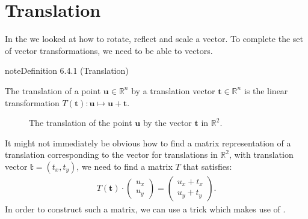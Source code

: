 \documentclass[letterpaper,10pt,english]{jupyterBook}
\let\sphinxpxdimen\pdfpxdimen\else\newdimen\sphinxpxdimen
\begin{document}
\sphinxstepscope

\ignorespaces 

\section{Translation}
\label{\detokenize{_pages/6.4_Translation:translation}}\label{\detokenize{_pages/6.4_Translation:index-0}}\label{\detokenize{_pages/6.4_Translation:translation-section}}\label{\detokenize{_pages/6.4_Translation::doc}}
\sphinxAtStartPar
In the {\hyperref[\detokenize{_pages/6.3_Rotation_reflection_and_translation:rotation-reflection-and-scaling-section}]{}} we looked at how to rotate, reflect and scale a vector. To complete the set of vector transformations, we need to be able to  vectors.
\label{_pages/6.4_Translation:translation-definition}
\begin{sphinxadmonition}{note}{Definition 6.4.1 (Translation)}



\sphinxAtStartPar
The translation of a point \(\mathbf{u} \in \mathbb{R}^n\) by a translation vector \(\mathbf{t} \in \mathbb{R}^n\) is the linear transformation \(T(\mathbf{t}): \mathbf{u} \mapsto \mathbf{u} + \mathbf{t}\).
\end{sphinxadmonition}

\begin{figure}[htbp]
\centering
\capstart

\noindent\sphinxincludegraphics[width=400\sphinxpxdimen]{{6_translation}.svg}
\caption{The translation of the point \(\mathbf{u}\) by the vector \(\mathbf{t}\) in \(\mathbb{R}^2\).}\label{\detokenize{_pages/6.4_Translation:translation-figure}}\end{figure}

\sphinxAtStartPar
It might not immediately be obvious how to find a matrix representation of a translation corresponding to the vector \sphinxhyphen{} for translations in \(\mathbb{R}^2\), with translation vector \(\mathbb{t} = (t_x, t_y)\), we need to find a matrix \(T\) that satisfies:
\begin{equation*}
\begin{split} T(\mathbf{t}) \cdot \begin{pmatrix} u_x \\ u_y \end{pmatrix}  = \begin{pmatrix} u_x + t_x \\ u_y + t_y \end{pmatrix}. \end{split}
\end{equation*}
\ignorespaces 
\sphinxAtStartPar
In order to construct such a matrix, we can use a trick which makes use of .
\end{document}

